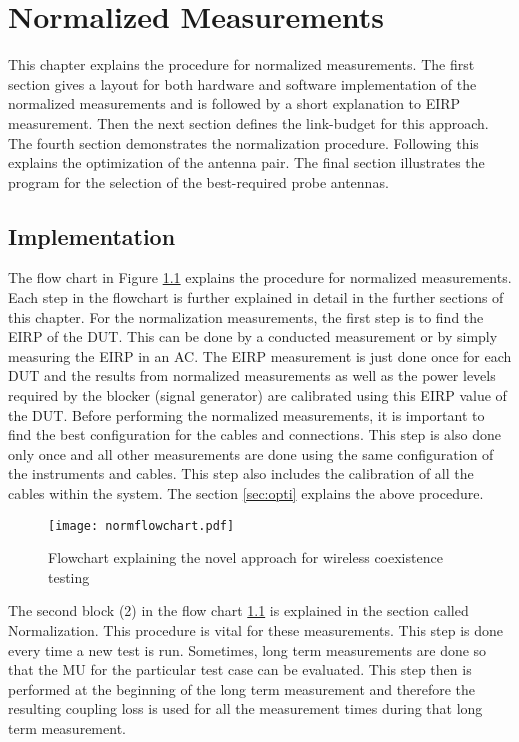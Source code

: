 \chapter{Normalized Measurements}\label{chap:normalized}
This chapter explains the procedure for normalized measurements. The first section gives a layout for both hardware and software implementation of the normalized measurements and is followed by a short explanation to \acs{EIRP} measurement. Then the next section defines the link-budget for this approach. The fourth section demonstrates the normalization procedure. Following this explains the optimization of the antenna pair. The final section illustrates the program for the selection of the best-required probe antennas.


\section{Implementation}
The flow chart in Figure \ref{fig:1} explains the procedure for normalized measurements. Each step in the flowchart is further explained in detail in the further sections of this chapter. For the normalization measurements, the first step is to find the \acs{EIRP} of the \acs{DUT}. This can be done by a conducted measurement or by simply measuring the \acs{EIRP} in an \acf{AC}. The \acs{EIRP} measurement is just done once for each \acs{DUT} and the results from normalized measurements as well as the power levels required by the blocker (signal generator) are calibrated using this \acs{EIRP} value of the \acs{DUT}. Before performing the normalized measurements, it is important to find the best configuration for the cables and connections. This step is also done only once and all other measurements are done using the same configuration of the instruments and cables. This step also includes the calibration of all the cables within the system.  The section \ref{sec:opti} explains the above procedure.

\begin{figure}[H]
\centering
\texttt{[image: normflowchart.pdf]}
\vspace{-2.2cm} \caption{Flowchart explaining the novel approach for wireless coexistence testing}
\label{fig:1} 
\end{figure}

The second block (2) in the flow chart \ref{fig:1} is explained in the section called Normalization. This procedure is vital for these measurements. This step is done every time a new test is run. Sometimes, long term measurements are done so that the \acf{MU} for the particular test case can be evaluated. This step then is performed at the beginning of the long term measurement and therefore the resulting coupling loss is used for all the measurement times during that long term measurement. \\
 
